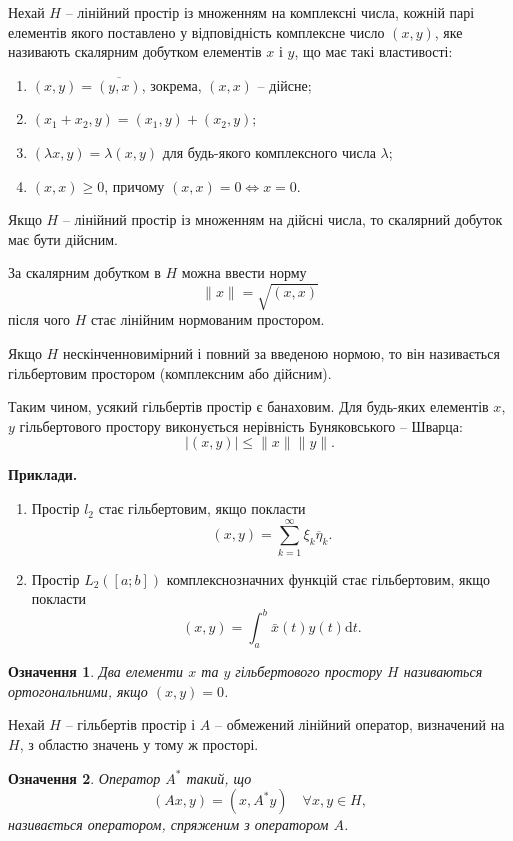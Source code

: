 \documentclass[14pt,twoside]{extreport}
\theoremstyle{mystyle}
\newtheorem{dfn}{Означення}
\numberwithin{equation}{chapter}
\begin{document}
Нехай $H$ -- лінійний простір із множенням на комплексні числа, кожній парі елементів якого поставлено у відповідність комплексне число $(x, y)$, яке називають скалярним добутком елементів $x$ і $y$, що має такі властивості:
\begin{enumerate}
	\item $(x, y) = \overline{(y, x)}$, зокрема, $(x, x)$ -- дійсне;
	\item $(x_1 + x_2, y) = (x_1, y) + (x_2, y)$;
	\item $(\lambda x, y) = \lambda (x, y)$ для будь-якого комплексного числа $\lambda$;
	\item $(x, x) \geqslant 0$, причому $(x, x) = 0 \Leftrightarrow x=0$.
\end{enumerate}

Якщо $H$ -- лінійний простір із множенням на дійсні числа, то скалярний добуток має бути дійсним.

За скалярним добутком в $H$ можна ввести норму
\[
\|x\| = \sqrt{(x, x)}
\]
після чого $H$ стає лінійним нормованим простором.

Якщо $H$ нескінченновимірний і повний за введеною нормою, то він називається гільбертовим простором (комплексним або дійсним).

Таким чином, усякий гільбертів простір є банаховим. Для будь-яких елементів $x$, $y$ гільбертового простору виконується нерівність Буняковського -- Шварца:
\[
|(x, y)| \leqslant \|x\| \|y\|.
\]

\textbf{Приклади.}

\begin{enumerate}
	\item Простір $l_2$ стає гільбертовим, якщо покласти
	\[
	(x, y) = \sum_{k=1}^{\infty}\xi_k \overline{\eta}_k.
	\]
	\item Простір $L_2([a; b])$ комплекснозначних функцій стає гільбертовим, якщо покласти
	\[
	(x, y) = \int_{a}^{b} \bar{x}(t) y(t) \mathrm{d}t.
	\]
\end{enumerate}

\begin{dfn}
	Два елементи $x$ та $y$ гільбертового простору $H$ називаються ортогональними, якщо $(x, y) = 0$.
\end{dfn}

Нехай $H$ -- гільбертів простір і $A$ -- обмежений лінійний оператор, визначений на $H$, з областю значень у тому ж просторі.

\begin{dfn}
	Оператор $A^*$ такий, що
	\begin{equation}\label{conjugateop}
	(Ax, y) = (x, A^*y) \quad \forall x, y \in H,
	\end{equation}
	називається оператором, спряженим з оператором $A$.
\end{dfn}
\end{document}
